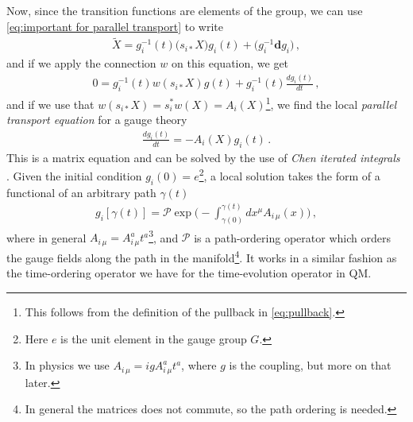 Now, since the transition functions are elements of the group, we can use \cref{eq:important for parallel transport} to write
\begin{align}
    \tilde{X}=g_{i}^{-1}(t)\big(s_{i*}X\big)g_{i}(t)+\big(g_{i}^{-1}\mathbf{d}g_{i}\big)\,,
\end{align}
and if we apply the connection $w$ on this equation, we get
\begin{align}
    0=g_{i}^{-1}(t)w(s_{i*}X)g(t)+g_{i}^{-1}(t)\frac{dg_{i}(t)}{dt}\,,
\end{align}
and if we use that $w(s_{i*}X)=s_{i}^{*}w(X)=A_{i}(X)$\footnote{This follows from the definition of the pullback in \cref{eq:pullback}.}, we find the local \emph{parallel transport equation} for a gauge theory
\begin{align}
    \frac{dg_{i}(t)}{dt}=-A_{i}(X)g_{i}(t)\,.
\end{align}
This is a matrix equation and can be solved by the use of \emph{Chen iterated integrals} \cite{chen1977}. Given the initial condition $g_{i}(0)=e$\footnote{Here $e$ is the unit element in the gauge group $G$.}, a local solution takes the form of a functional of an arbitrary path $\gamma(t)$
\begin{align}\label{eq:parallel transporter}
    g_{i}[\gamma(t)]=\mathcal{P}\exp\Big(-\int_{\gamma(0)}^{\gamma(t)}dx^{\mu}A_{i\,\mu}(x)\Big)\,,
\end{align}
where in general $A_{i\,\mu}=A_{i\,\mu}^{a}t^{a}$\footnote{In physics we use $A_{i\,\mu}=igA_{i\,\mu}^{a}t^{a}$, where $g$ is the coupling, but more on that later.}, and $\mathcal{P}$ is a path-ordering operator which orders the gauge fields along the path in the manifold\footnote{In general the matrices does not commute, so the path ordering is needed.}. It works in a similar fashion as the time-ordering operator we have for the time-evolution operator in QM.

